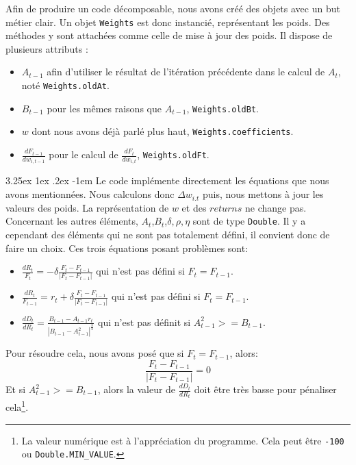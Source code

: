 \documentclass[a4paper, 11pt]{article}
\makeatletter
\renewcommand\paragraph{\@startsection{paragraph}{5}{\z@}%
  {3.25ex \@plus1ex \@minus.2ex}%
  {-1em}%
  {\normalfont\normalsize\bfseries}}
\makeatother
\begin{document}
Afin de produire un code décomposable, nous avons créé des objets avec un but métier clair. Un objet \texttt{Weights} est donc instancié, représentant
les poids. Des méthodes y sont attachées comme celle de mise à jour des poids. Il dispose de plusieurs attributs :
\begin{itemize}
 \item $A_{t-1}$ afin d'utiliser le résultat de l'itération précédente dans le calcul de $A_t$, noté \texttt{Weights.oldAt}.
 \item $B_{t-1}$ pour les mêmes raisons que $A_{t-1}$, \texttt{Weights.oldBt}.
 \item $w$ dont nous avons déjà parlé plus haut, \texttt{Weights.coefficients}.
 \item $\frac{dF_{t-1}}{dw_{i,t-1}}$ pour le calcul de $\frac{dF_{t}}{dw_{i,t}}$, \texttt{Weights.oldFt}.
\end{itemize}

\paragraph{}
Le code implémente directement les équations que nous avons mentionnées. Nous calculons donc $\Delta w_{i.t}$ puis,
nous mettons à jour les valeurs des poids. La représentation de $w$ et des $returns$ ne change pas. Concernant les autres éléments, 
$A_t$,$B_t$,$\delta,\rho,\eta$ sont de type \texttt{Double}. Il y a cependant des éléments qui ne sont pas totalement défini, il convient donc de faire 
un choix. Ces trois équations posant problèmes sont:
\begin{itemize}
 \item $\frac{dR_t}{F_t} = -\delta \frac{F_t - F_{t-1}}{|F_t - F_{t-1}|}$ qui n'est pas défini si $F_t = F_{t-1}$.\\
 \item $\frac{dR_t}{F_{t-1}} = r_t + \delta \frac{F_t - F_{t-1}}{|F_t - F_{t-1}|}$ qui n'est pas défini si $F_t = F_{t-1}$.\\
 \item $\frac{dD_t}{dR_t} = \frac{B_{t-1} - A_{t-1}r_t}{|B_{t-1} - A_{t-1}^2|^{\frac{3}{2}}}$ qui n'est pas définit si $A_{t-1}^2 >= B_{t-1}$.
\end{itemize}

Pour résoudre cela, nous avons posé que si $F_t = F_{t-1}$, alors: 
$$\frac{F_t - F_{t-1}}{|F_t - F_{t-1}|} = 0$$
Et si $A_{t-1}^2 >= B_{t-1}$, alors la valeur de $\frac{dD_t}{dR_t}$ doit être très basse pour pénaliser cela\footnote{La valeur numérique est à 
l'appréciation du programme. Cela peut être \texttt{-100} ou \texttt{Double.MIN\_VALUE}.}.
\end{document}
